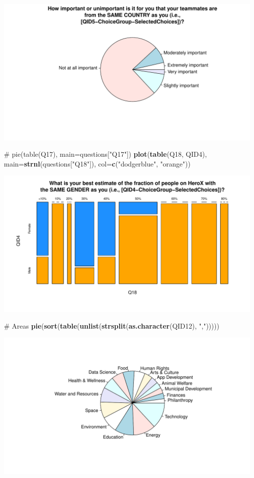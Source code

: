 \documentclass[12pt, titlepage]{article}
\newenvironment{Shaded}{\begin{snugshade}}{\end{snugshade}}
\newcommand{\KeywordTok}[1]{\textcolor[rgb]{0.12,0.11,0.11}{\textbf{#1}}}
\newcommand{\DataTypeTok}[1]{\textcolor[rgb]{0.00,0.34,0.68}{#1}}
\newcommand{\StringTok}[1]{\textcolor[rgb]{0.75,0.01,0.01}{#1}}
\newcommand{\CommentTok}[1]{\textcolor[rgb]{0.54,0.53,0.53}{#1}}
\newcommand{\NormalTok}[1]{\textcolor[rgb]{0.12,0.11,0.11}{#1}}
\begin{document}
\includegraphics{analysis_survey_files/figure-latex/unnamed-chunk-2-12.pdf}

\begin{Shaded}
\begin{Highlighting}[]
\CommentTok{# pie(table(Q17), main=questions["Q17"])}
\KeywordTok{plot}\NormalTok{(}\KeywordTok{table}\NormalTok{(Q18, QID4), }\DataTypeTok{main=}\KeywordTok{strnl}\NormalTok{(questions[}\StringTok{"Q18"}\NormalTok{]), }\DataTypeTok{col=}\KeywordTok{c}\NormalTok{(}\StringTok{"dodgerblue"}\NormalTok{, }\StringTok{"orange"}\NormalTok{))}
\end{Highlighting}
\end{Shaded}

\includegraphics{analysis_survey_files/figure-latex/unnamed-chunk-2-13.pdf}

\begin{Shaded}
\begin{Highlighting}[]
\CommentTok{# Areas}
\KeywordTok{pie}\NormalTok{(}\KeywordTok{sort}\NormalTok{(}\KeywordTok{table}\NormalTok{(}\KeywordTok{unlist}\NormalTok{(}\KeywordTok{strsplit}\NormalTok{(}\KeywordTok{as.character}\NormalTok{(QID12), }\StringTok{","}\NormalTok{)))))}
\end{Highlighting}
\end{Shaded}

\includegraphics{analysis_survey_files/figure-latex/unnamed-chunk-2-14.pdf}


\end{document}
